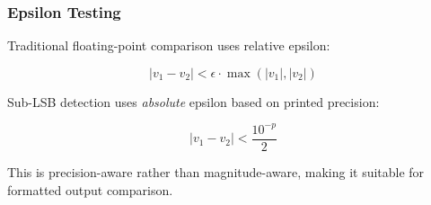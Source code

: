 \subsubsection{Epsilon Testing}

Traditional floating-point comparison uses relative epsilon:

\begin{equation}
    |v_1 - v_2| < \epsilon \cdot \max(|v_1|, |v_2|)
\end{equation}

Sub-LSB detection uses \emph{absolute} epsilon based on printed precision:

\begin{equation}
    |v_1 - v_2| < \frac{10^{-p}}{2}
\end{equation}

This is precision-aware rather than magnitude-aware, making it suitable for formatted output comparison.
